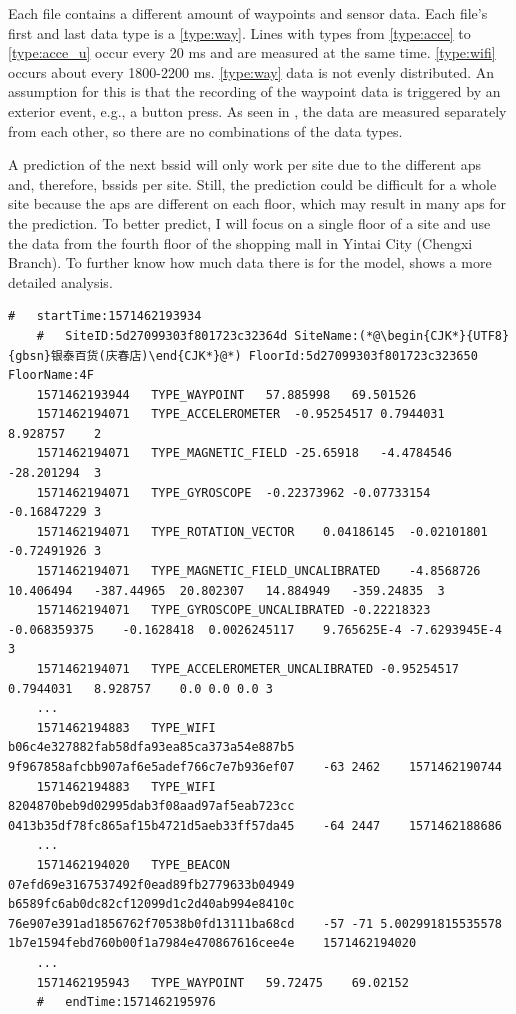 Each file contains a different amount of waypoints and sensor data.
Each file's first and last data type is a \ref{type:way}.
Lines with types from \ref{type:acce} to \ref{type:acce_u} occur every 20 ms and are measured at the same time.
\ref{type:wifi} occurs about every 1800-2200 ms.
\ref{type:way} data is not evenly distributed.
An assumption for this is that the recording of the waypoint data is triggered by an exterior event, e.g., a button press.
As seen in , the data are measured separately from each other, so there are no combinations of the data types.

A prediction of the next \ac{bssid} will only work per site due to the different \acp{ap} and, therefore, \acp{bssid} per site.
Still, the prediction could be difficult for a whole site because the \acp{ap} are different on each floor, which may result in many \acp{ap} for the prediction.
To better predict, I will focus on a single floor of a site and use the data from the fourth floor of the shopping mall in Yintai City (Chengxi Branch).
To further know how much data there is for the model,  shows a more detailed analysis.


\begin{lstlisting}[caption={A snippet from the dataset of the file 5daa9e38df065a00069beb79.txt of the floor F4},label={lst:dataset}]
    #   startTime:1571462193934
    #   SiteID:5d27099303f801723c32364d SiteName:(*@\begin{CJK*}{UTF8}{gbsn}银泰百货(庆春店)\end{CJK*}@*) FloorId:5d27099303f801723c323650 FloorName:4F
    1571462193944   TYPE_WAYPOINT   57.885998   69.501526
    1571462194071   TYPE_ACCELEROMETER  -0.95254517 0.7944031   8.928757    2
    1571462194071   TYPE_MAGNETIC_FIELD -25.65918   -4.4784546  -28.201294  3
    1571462194071   TYPE_GYROSCOPE  -0.22373962 -0.07733154 -0.16847229 3
    1571462194071   TYPE_ROTATION_VECTOR    0.04186145  -0.02101801 -0.72491926 3
    1571462194071   TYPE_MAGNETIC_FIELD_UNCALIBRATED    -4.8568726  10.406494   -387.44965  20.802307   14.884949   -359.24835  3
    1571462194071   TYPE_GYROSCOPE_UNCALIBRATED -0.22218323 -0.068359375    -0.1628418  0.0026245117    9.765625E-4 -7.6293945E-4   3
    1571462194071   TYPE_ACCELEROMETER_UNCALIBRATED -0.95254517 0.7944031   8.928757    0.0 0.0 0.0 3
    ...
    1571462194883   TYPE_WIFI   b06c4e327882fab58dfa93ea85ca373a54e887b5    9f967858afcbb907af6e5adef766c7e7b936ef07    -63 2462    1571462190744
    1571462194883   TYPE_WIFI   8204870beb9d02995dab3f08aad97af5eab723cc    0413b35df78fc865af15b4721d5aeb33ff57da45    -64 2447    1571462188686
    ...
    1571462194020   TYPE_BEACON 07efd69e3167537492f0ead89fb2779633b04949    b6589fc6ab0dc82cf12099d1c2d40ab994e8410c    76e907e391ad1856762f70538b0fd13111ba68cd    -57 -71 5.002991815535578   1b7e1594febd760b00f1a7984e470867616cee4e    1571462194020
    ...
    1571462195943   TYPE_WAYPOINT   59.72475    69.02152
    #   endTime:1571462195976
\end{lstlisting}

